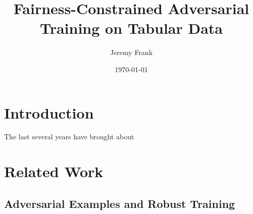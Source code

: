 \documentclass[11pt]{article}
\title{Fairness-Constrained Adversarial Training on Tabular Data}
\author{Jeremy Frank}
\date{\today}
\begin{document}
\maketitle

\begin{abstract}
\end{abstract}

\section{Introduction}\label{sec:introduction}

The last several years have brought about 


\section{Related Work}\label{sec:relatedwork}

\subsection{Adversarial Examples and Robust Training}
\end{document}
